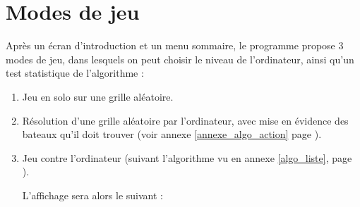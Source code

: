 \newpage
\section{Modes de jeu}
Après un écran d'introduction et un menu sommaire, le programme propose 3 modes de jeu, dans lesquels on peut choisir le niveau de l'ordinateur, ainsi qu'un test statistique de l'algorithme :
\begin{enumerate}
\item Jeu en solo sur une grille aléatoire.
\item Résolution d'une grille aléatoire par l'ordinateur, avec mise en évidence des bateaux qu'il doit trouver (voir annexe \ref{annexe_algo_action} page \pageref{annexe_algo_action}).
\item Jeu contre l'ordinateur (suivant l'algorithme vu en annexe \ref{algo_liste}, page \pageref{algo_partie}).

L'affichage sera alors le suivant :


\end{enumerate}

